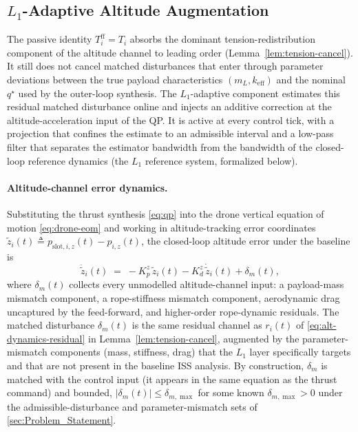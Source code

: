 \subsection{$L_1$-Adaptive Altitude Augmentation}
\label{sec:l1-augmentation}

The passive identity $T_i^{\mathrm{ff}} = T_i$ absorbs the dominant tension-redistribution component of the altitude channel to leading order (Lemma~\ref{lem:tension-cancel}). It still does not cancel matched disturbances that enter through parameter deviations between the true payload characteristics $(m_L, k_{\mathrm{eff}})$ and the nominal $q^\star$ used by the outer-loop synthesis. The $L_1$-adaptive component estimates this residual matched disturbance online and injects an additive correction at the altitude-acceleration input of the QP. It is active at every control tick, with a projection that confines the estimate to an admissible interval and a low-pass filter that separates the estimator bandwidth from the bandwidth of the closed-loop reference dynamics (the $L_1$ reference system, formalized below).

\paragraph{Altitude-channel error dynamics.}
Substituting the thrust synthesis \eqref{eq:qp} into the drone vertical equation of motion \eqref{eq:drone-eom} and working in altitude-tracking error coordinates $\tilde z_i(t) \triangleq p_{\mathrm{slot},i,z}(t) - p_{i,z}(t)$, the closed-loop altitude error under the baseline is
\begin{equation}
  \ddot{\tilde z}_i(t) \;=\; -K_p^z\,\tilde z_i(t)
    - K_d^z\,\dot{\tilde z}_i(t)
    + \delta_m(t),
  \label{eq:l1-channel}
\end{equation}
where $\delta_m(t)$ collects every unmodelled altitude-channel input: a payload-mass mismatch component, a rope-stiffness mismatch component, aerodynamic drag uncaptured by the feed-forward, and higher-order rope-dynamic residuals. The matched disturbance $\delta_m(t)$ is the same residual channel as $r_i(t)$ of \eqref{eq:alt-dynamics-residual} in Lemma~\ref{lem:tension-cancel}, augmented by the parameter-mismatch components (mass, stiffness, drag) that the $L_1$ layer specifically targets and that are not present in the baseline ISS analysis. By construction, $\delta_m$ is matched with the control input (it appears in the same equation as the thrust command) and bounded, $|\delta_m(t)| \le \delta_{m,\max}$ for some known $\delta_{m,\max} > 0$ under the admissible-disturbance and parameter-mismatch sets of \cref{sec:Problem_Statement}.

